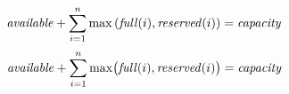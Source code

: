 $$
{\it available} +
\sum_{i=1}^n \max \left( {\it full}(i), {\it reserved}(i) \right)
= {\it capacity}
$$
$$
{\it available} +
\sum_{i=1}^n \max \bigl( {\it full}(i), {\it reserved}(i)\bigr)
= {\it capacity}
$$
\bye


